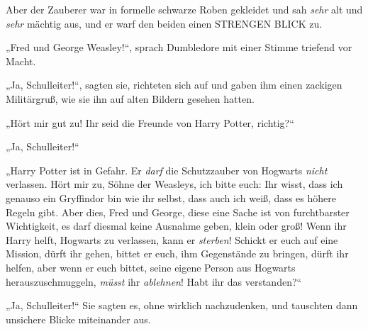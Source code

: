 Aber der Zauberer war in formelle schwarze Roben gekleidet und sah \emph{sehr} alt und \emph{sehr} mächtig aus, und er warf den beiden einen STRENGEN BLICK zu.

„Fred und George Weasley!“, sprach Dumbledore mit einer Stimme triefend vor Macht.

„Ja, Schulleiter!“, sagten sie, richteten sich auf und gaben ihm einen zackigen Militärgruß, wie sie ihn auf alten Bildern gesehen hatten.

„Hört mir gut zu! Ihr seid die Freunde von Harry Potter, richtig?“

„Ja, Schulleiter!“

„Harry Potter ist in Gefahr. Er \emph{darf} die Schutzzauber von Hogwarts \emph{nicht} verlassen. Hört mir zu, Söhne der Weasleys, ich bitte euch: Ihr wisst, dass ich genauso ein Gryffindor bin wie ihr selbst, dass auch ich weiß, dass es höhere Regeln gibt. Aber dies, Fred und George, diese eine Sache ist von furchtbarster Wichtigkeit, es darf diesmal keine Ausnahme geben, klein oder groß! Wenn ihr Harry helft, Hogwarts zu verlassen, kann er \emph{sterben}! Schickt er euch auf eine Mission, dürft ihr gehen, bittet er euch, ihm Gegenstände zu bringen, dürft ihr helfen, aber wenn er euch bittet, seine eigene Person aus Hogwarts herauszuschmuggeln, \emph{müsst} ihr \emph{ablehnen}! Habt ihr das verstanden?“

„Ja, Schulleiter!“ Sie sagten es, ohne wirklich nachzudenken, und tauschten dann unsichere Blicke miteinander aus.

